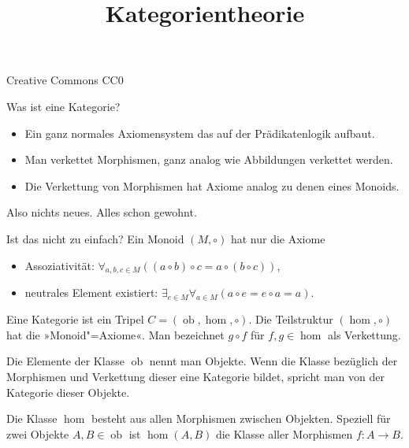 \documentclass{beamer}
\title{Kategorientheorie}
\date{}
\newcommand{\modest}[1]{{\small\color{gray}#1}}
\newcommand{\ob}{\operatorname{ob}}
\begin{document}
\begin{frame}
\maketitle
\vfill\hfill
\modest{Creative Commons CC0}
\end{frame}

\begin{frame}
Was ist eine Kategorie?
\end{frame}

\begin{frame}
\begin{itemize}
\item Ein ganz normales Axiomensystem das auf der Prädikatenlogik aufbaut.
\item Man verkettet Morphismen, ganz analog wie Abbildungen
  verkettet werden.
\item Die Verkettung von Morphismen hat Axiome analog zu denen
  eines Monoids.
\end{itemize}
\end{frame}

\begin{frame}
Also nichts neues. Alles schon gewohnt.
\end{frame}

\begin{frame}
Ist das nicht zu einfach? Ein Monoid $(M,\circ)$ hat nur die Axiome
\begin{itemize}
\item Assoziativität: $\forall_{a,b,c{\in}M}((a\circ b)\circ c = a\circ (b\circ c))$,
\item neutrales Element existiert: $\exists_{e\in M}\forall_{a\in M}(a\circ e = e\circ a = a)$.
\end{itemize}
\end{frame}

\begin{frame}
Eine Kategorie ist ein Tripel $C=(\operatorname{ob},\hom,\circ)$.
Die Teilstruktur $(\hom,\circ)$ hat die »Monoid"=Axiome«.
Man bezeichnet $g\circ f$ für $f,g\in\hom$ als Verkettung.

\vspace{1em}
Die Elemente der Klasse $\ob$ nennt man Objekte.
Wenn die Klasse bezüglich der Morphismen und Verkettung dieser
eine Kategorie bildet, spricht man von der Kategorie dieser Objekte.
\end{frame}

\begin{frame}
Die Klasse $\hom$ besteht aus allen Morphismen zwischen Objekten.
Speziell für zwei Objekte $A,B\in\ob$ ist $\hom(A,B)$ die Klasse
aller Morphismen $f\colon A\to B$.
\end{frame}
\end{document}
